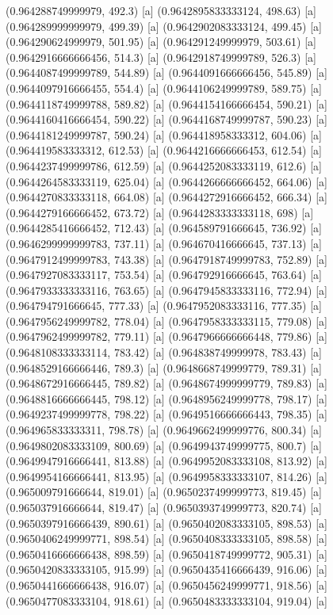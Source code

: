 {{{(0.964288749999979, 492.3) [a] 
(0.9642895833333124, 498.63) [a] 
(0.964289999999979, 499.39) [a] 
(0.9642902083333124, 499.45) [a] 
(0.964290624999979, 501.95) [a] 
(0.964291249999979, 503.61) [a] 
(0.9642916666666456, 514.3) [a] 
(0.9642918749999789, 526.3) [a] 
(0.9644087499999789, 544.89) [a] 
(0.9644091666666456, 545.89) [a] 
(0.9644097916666455, 554.4) [a] 
(0.9644106249999789, 589.75) [a] 
(0.9644118749999788, 589.82) [a] 
(0.9644154166666454, 590.21) [a] 
(0.9644160416666454, 590.22) [a] 
(0.9644168749999787, 590.23) [a] 
(0.9644181249999787, 590.24) [a] 
(0.964418958333312, 604.06) [a] 
(0.964419583333312, 612.53) [a] 
(0.9644216666666453, 612.54) [a] 
(0.9644237499999786, 612.59) [a] 
(0.9644252083333119, 612.6) [a] 
(0.9644264583333119, 625.04) [a] 
(0.9644266666666452, 664.06) [a] 
(0.9644270833333118, 664.08) [a] 
(0.9644272916666452, 666.34) [a] 
(0.9644279166666452, 673.72) [a] 
(0.9644283333333118, 698) [a] 
(0.9644285416666452, 712.43) [a] 
(0.964589791666645, 736.92) [a] 
(0.9646299999999783, 737.11) [a] 
(0.964670416666645, 737.13) [a] 
(0.9647912499999783, 743.38) [a] 
(0.9647918749999783, 752.89) [a] 
(0.9647927083333117, 753.54) [a] 
(0.964792916666645, 763.64) [a] 
(0.9647933333333116, 763.65) [a] 
(0.9647945833333116, 772.94) [a] 
(0.964794791666645, 777.33) [a] 
(0.9647952083333116, 777.35) [a] 
(0.9647956249999782, 778.04) [a] 
(0.9647958333333115, 779.08) [a] 
(0.9647962499999782, 779.11) [a] 
(0.9647966666666448, 779.86) [a] 
(0.9648108333333114, 783.42) [a] 
(0.964838749999978, 783.43) [a] 
(0.9648529166666446, 789.3) [a] 
(0.9648668749999779, 789.31) [a] 
(0.9648672916666445, 789.82) [a] 
(0.9648674999999779, 789.83) [a] 
(0.9648816666666445, 798.12) [a] 
(0.9648956249999778, 798.17) [a] 
(0.9649237499999778, 798.22) [a] 
(0.9649516666666443, 798.35) [a] 
(0.964965833333311, 798.78) [a] 
(0.9649662499999776, 800.34) [a] 
(0.9649802083333109, 800.69) [a] 
(0.9649943749999775, 800.7) [a] 
(0.9649947916666441, 813.88) [a] 
(0.9649952083333108, 813.92) [a] 
(0.9649954166666441, 813.95) [a] 
(0.9649958333333107, 814.26) [a] 
(0.965009791666644, 819.01) [a] 
(0.9650237499999773, 819.45) [a] 
(0.965037916666644, 819.47) [a] 
(0.9650393749999773, 820.74) [a] 
(0.9650397916666439, 890.61) [a] 
(0.9650402083333105, 898.53) [a] 
(0.9650406249999771, 898.54) [a] 
(0.9650408333333105, 898.58) [a] 
(0.9650416666666438, 898.59) [a] 
(0.9650418749999772, 905.31) [a] 
(0.9650420833333105, 915.99) [a] 
(0.9650435416666439, 916.06) [a] 
(0.9650441666666438, 916.07) [a] 
(0.9650456249999771, 918.56) [a] 
(0.9650477083333104, 918.61) [a] 
(0.9650483333333104, 919.04) [a] 
}}}
